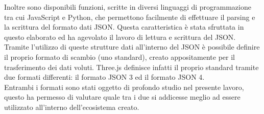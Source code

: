 Inoltre sono disponibili funzioni, scritte in diversi linguaggi di programmazione tra cui JavaScript e Python, che permettono facilmente di effettuare il parsing e la scrittura del formato dati JSON. Questa caratteristica è stata sfruttata in questo elaborato ed ha agevolato il lavoro di lettura e scrittura del JSON.
Tramite l’utilizzo di queste strutture dati all’interno del JSON è possibile definire il proprio formato di scambio (uno standard), creato appositamente per il trasferimento dei dati voluti.
Three.js definisce infatti il proprio standard tramite due formati differenti: il formato JSON 3 ed il formato JSON 4. 
\\
Entrambi i formati sono stati oggetto di profondo studio nel presente lavoro, questo ha permesso di valutare quale tra i due si addicesse meglio ad essere utilizzato all’interno dell’ecosistema creato. 

